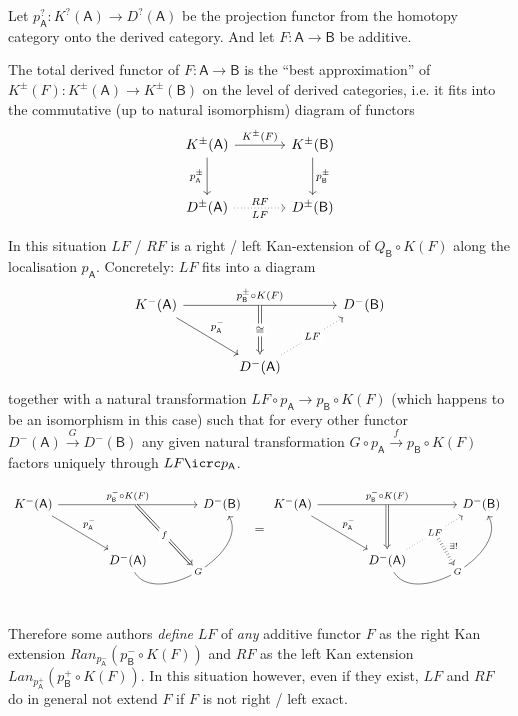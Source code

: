 \documentclass[fontsize=11pt,fleqn,a4paper]{scrartcl}
\begin{document}
\begin{definition}
Let $p_\mathsf{A}^?: K^?(\mathsf{A}) \to D^?(\mathsf{A})$ be the projection functor from the homotopy category onto the derived category. And let $F:\mathsf{A}\to\mathsf{B}$ be additive.

The total derived functor of $F:\mathsf{A}\to\mathsf{B}$ is the \enquote{best approximation} of $K^\pm(F): K^\pm(\mathsf{A}) \to K^\pm(\mathsf{B})$ on the level of derived categories, i.e. it fits into the commutative (up to natural isomorphism) diagram of functors
\[\begin{tikzcd}[sep = large]
K^{\pm}(\mathsf{A}) \ar[r,"K^\pm(F)"] \ar[d,"p_\mathsf{A}^\pm"'] & K^{\pm}(\mathsf{B}) \ar[d,"p_\mathsf{B}^\pm"] \\
D^\pm(\mathsf{A}) \ar[r,dotted,"LF"',"RF"] & D^\pm(\mathsf{B})
\end{tikzcd}\]
\end{definition}

\begin{remark}
In this situation $LF$ / $RF$ is a right / left Kan-extension of $Q_\mathsf{B}\circ K(F)$ along the localisation $p_\mathsf{A}$. Concretely: $LF$ fits into a diagram
\[\begin{tikzcd}[sep = large]
K^-(\mathsf{A}) \ar[rr,"p_\mathsf{B}^\pm\circ K(F)"{name=top_arrow}] \ar[dr,"p_\mathsf{A}^-"] && D^-(\mathsf{B}) \\
 & D^-(\mathsf{A}) \ar[ur,dotted,"LF"{name=LF, description}] \ar[from=top_arrow,Rightarrow,"\isomorphic" description]
\end{tikzcd}\]
together with a natural transformation $LF \circ p_\mathsf{A} \to p_\mathsf{B} \circ K(F)$ (which happens to be an isomorphism in this case) such that for every other functor $D^-(\mathsf{A}) \xrightarrow{G} D^-(\mathsf{B})$ any given natural transformation $G \circ p_\mathsf{A} \xrightarrow{f} p_\mathsf{B} \circ K(F)$ factors uniquely through $LF\icrc p_\mathsf{A}$.

\[\begin{tikzcd}[sep = large]
K^-(\mathsf{A}) \ar[rr,"p_\mathsf{B}^-\circ K(F)"{name=top_arrow}] \ar[dr,"p_\mathsf{A}^-"] && D^-(\mathsf{B}) \\
 & D^-(\mathsf{A}) \ar[ur,bend right=90,"G"{name=G, description}]
\arrow[from=top_arrow,to=G, Rightarrow,"f" description]
\end{tikzcd}
=
\begin{tikzcd}[sep = large]
K^-(\mathsf{A}) \ar[rr,"p_\mathsf{B}^-\circ K(F)"{name=top_arrow}] \ar[dr,"p_\mathsf{A}^-"] && D^-(\mathsf{B}) \\
 & D^-(\mathsf{A}) \ar[ur,dotted,"LF"{name=LF, description}] \ar[ur,bend right=90,"G"{name=G,description}] \ar[from=top_arrow,Rightarrow]
\arrow[Rightarrow,dotted, from=LF, to=G,"\exists!"]
\end{tikzcd}\]

Therefore some authors \emph{define} $LF$ of \emph{any} additive functor $F$ as the right Kan extension $Ran_{p_\mathsf{A}^-}( p_\mathsf{B}^- \circ K(F))$ and $RF$ as the left Kan extension $Lan_{p_\mathsf{A}^+}(p_\mathsf{B}^+\circ K(F))$. In this situation however, even if they exist, $LF$ and $RF$ do in general not extend $F$ if $F$ is not right / left exact.
\end{remark}
\end{document}
